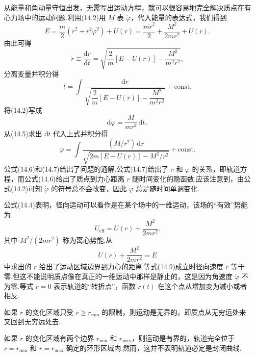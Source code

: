 从能量和角动量守恒出发，无需写出运动方程，就可以很容易地完全解决质点在有心力场中的运动问题.利用(14.2)用 $M$ 表 $\dot{\varphi}$，代入能量的表达式，我们得到
\begin{equation}
  E=\frac{m}{2}\left(\dot{r}^2+r^2\dot{\varphi}^2\right)+U(r)
  =\frac{m\dot{r}^2}{2}
  +\frac{M^2}{2mr^2}+U(r).
\end{equation}
由此可得
\begin{equation}
  \dot{r}\equiv\frac{\mathrm{d}r}{\mathrm{d}t}
  =\sqrt{\frac{2}{m}\left[E-U(r)\right]
  -\frac{M^2}{m^2r^2}},
\end{equation}
分离变量并积分得
\begin{equation}
  t=\int\frac{\mathrm{d}r}
  {\sqrt{\dfrac{2}{m}\left[E-U(r)\right]
  -\dfrac{M^2}{m^2r^2}}}+\mathrm{const}.
\end{equation}
将(14.2)写成
\begin{equation*}
  \mathrm{d}\varphi=\frac{M}{mr^2}\,\mathrm{d}t,
\end{equation*}
从(14.5)求出 $\mathrm{d}t$ 代入上式并积分得
\begin{equation}
  \varphi=\int
  \frac{(M/r^2)\,\mathrm{d}r}
  {\sqrt{2m\left[E-U(r)\right]-M^2/r^2}}
  +\mathrm{const}.
\end{equation}
公式(14.6)和(14.7)给出了问题的通解.公式(14.7)给出了 $r$ 和 $\varphi$ 的关系，即轨道方程，而公式(14.6)给出了质点到力心距离 $r$ 随时间变化的隐函数.应该注意到，由公式(14.2)可知 $\dot{\varphi}$ 的符号总不会改变，因此 $\varphi$ 总是随时间单调变化.

公式(14.4)表明，径向运动可以看作是在某个场中的一维运动，该场的“有效”势能为
\begin{equation}
  U_{\mathrm{eff}}=U(r)+\frac{M^2}{2mr^2}.
\end{equation}
其中 $M^2/(2mr^2)$ 称为离心势能.从
\begin{equation}
  U(r)+\frac{M^2}{2mr^2}=E
\end{equation}
中求出的 $r$ 给出了运动区域边界到力心的距离.等式(14.9)成立时径向速度 $\dot{r}$ 等于零.但这不能说明质点像在真正的一维运动中那样是静止的，这是因为角速度 $\dot{\varphi}$ 不为零.等式 $\dot{r}=0$ 表示轨道的“转折点”，函数 $r(t)$ 在这个点从增加变为减小或者相反.

如果 $r$ 的变化区域只受 $r\geqslant r_{\min}$ 的限制，则运动是无界的，即质点从无穷远处来又回到无穷远处去.

如果 $r$ 的变化区域有两个边界 $r_{\min}$ 和 $r_{\max}$，则运动是有界的，轨道完全位于 $r=r_{\min}$ 和 $r=r_{\max}$ 确定的环形区域内.然而，这并不表明轨道必定是封闭曲线.

